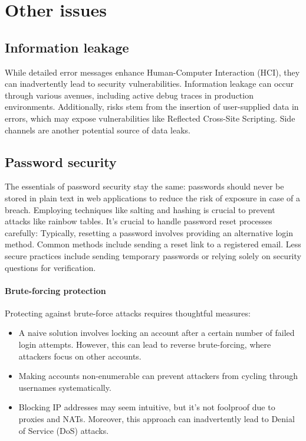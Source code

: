 \section{Other issues}

\subsection{Information leakage}
While detailed error messages enhance Human-Computer Interaction (HCI), they can inadvertently lead to security vulnerabilities. 
Information leakage can occur through various avenues, including active debug traces in production environments. 
Additionally, risks stem from the insertion of user-supplied data in errors, which may expose vulnerabilities like Reflected Cross-Site Scripting. 
Side channels are another potential source of data leaks.

\subsection{Password security}
The essentials of password security stay the same: passwords should never be stored in plain text in web applications to reduce the risk of exposure in case of a breach. 
Employing techniques like salting and hashing is crucial to prevent attacks like rainbow tables. 
It's crucial to handle password reset processes carefully: Typically, resetting a password involves providing an alternative login method. 
Common methods include sending a reset link to a registered email. 
Less secure practices include sending temporary passwords or relying solely on security questions for verification.

\paragraph*{Brute-forcing protection}
Protecting against brute-force attacks requires thoughtful measures:
\begin{itemize}
    \item A naive solution involves locking an account after a certain number of failed login attempts. 
        However, this can lead to reverse brute-forcing, where attackers focus on other accounts.
    \item Making accounts non-enumerable can prevent attackers from cycling through usernames systematically.
    \item  Blocking IP addresses may seem intuitive, but it's not foolproof due to proxies and NATs. 
        Moreover, this approach can inadvertently lead to Denial of Service (DoS) attacks.
\end{itemize}

